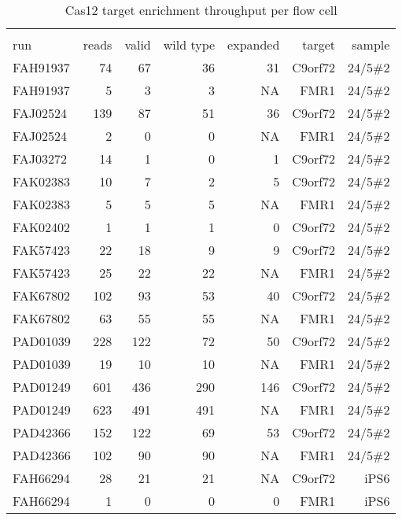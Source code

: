 \setlength\LTleft{0pt}
\setlength\LTright{0pt}
\begin{longtable}{lrrrrrr}
\caption[Cas12 target enrichment throughput per flow cell]{Cas12 target enrichment throughput per flow cell} \\
\label{tab:strique:Cas12} \\
run      & reads & valid & wild type & expanded & target  & sample  \\
\hline
FAH91937 & 74    & 67    & 36        & 31       & C9orf72 & 24/5\#2 \\
FAH91937 & 5     & 3     & 3         & NA       & FMR1    & 24/5\#2 \\
FAJ02524 & 139   & 87    & 51        & 36       & C9orf72 & 24/5\#2 \\
FAJ02524 & 2     & 0     & 0         & NA       & FMR1    & 24/5\#2 \\
FAJ03272 & 14    & 1     & 0         & 1        & C9orf72 & 24/5\#2 \\
FAK02383 & 10    & 7     & 2         & 5        & C9orf72 & 24/5\#2 \\
FAK02383 & 5     & 5     & 5         & NA       & FMR1    & 24/5\#2 \\
FAK02402 & 1     & 1     & 1         & 0        & C9orf72 & 24/5\#2 \\
FAK57423 & 22    & 18    & 9         & 9        & C9orf72 & 24/5\#2 \\
FAK57423 & 25    & 22    & 22        & NA       & FMR1    & 24/5\#2 \\
FAK67802 & 102   & 93    & 53        & 40       & C9orf72 & 24/5\#2 \\
FAK67802 & 63    & 55    & 55        & NA       & FMR1    & 24/5\#2 \\
PAD01039 & 228   & 122   & 72        & 50       & C9orf72 & 24/5\#2 \\
PAD01039 & 19    & 10    & 10        & NA       & FMR1    & 24/5\#2 \\
PAD01249 & 601   & 436   & 290       & 146      & C9orf72 & 24/5\#2 \\
PAD01249 & 623   & 491   & 491       & NA       & FMR1    & 24/5\#2 \\
PAD42366 & 152   & 122   & 69        & 53       & C9orf72 & 24/5\#2 \\
PAD42366 & 102   & 90    & 90        & NA       & FMR1    & 24/5\#2 \\
FAH66294 & 28    & 21    & 21        & NA       & C9orf72 & iPS6    \\
FAH66294 & 1     & 0     & 0         & 0        & FMR1    & iPS6    \\

\end{longtable}
